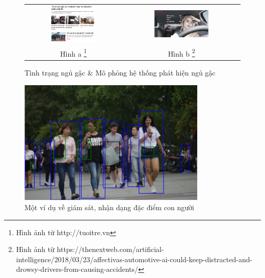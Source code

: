 \documentclass[a4paper]{report}
\begin{document}
\begin{figure}[h] 
	\centering
	\color{black}
	\begin{tabular}{cc}
		\\
		\includegraphics[width=0.5\textwidth]{1_04.png} &
		\includegraphics[width=0.49\textwidth]{1_06.png} \\
		
		Hình a \footnote[1]{Hình ảnh từ http://tuoitre.vn} & 
		Hình b \footnote[2]{Hình ảnh từ https://thenextweb.com/artificial-intelligence/2018/03/23/affectivas-automotive-ai-could-keep-distracted-and-drowsy-drivers-from-causing-accidents/}
	\end{tabular}

	\caption{Tình trạng ngủ gậc \& Mô phỏng hệ thống phát hiện ngủ gậc}
	\label{drowsiness}
\end{figure}	

\begin{figure}[h!]
\centering
\includegraphics[width=0.8\textwidth]{1_05.png}
\caption{Một ví dụ về giám sát, nhận dạng đặc điểm con người}
\end{figure}
\end{document}
